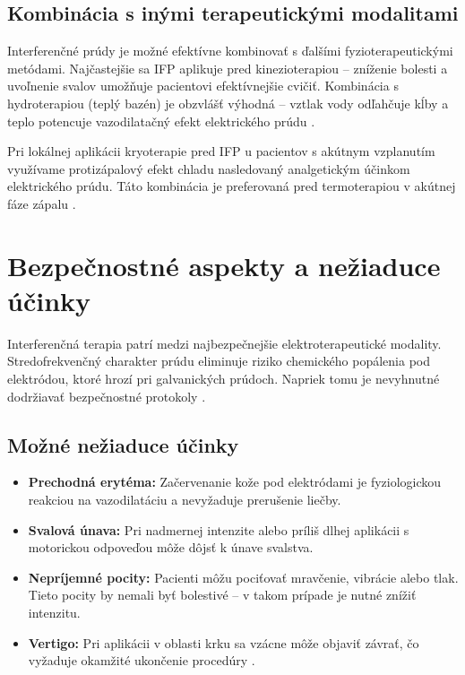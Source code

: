 \subsection{Kombinácia s inými terapeutickými modalitami}
Interferenčné prúdy je možné efektívne kombinovať s ďalšími fyzioterapeutickými metódami. Najčastejšie sa IFP aplikuje pred kinezioterapiou – zníženie bolesti a uvoľnenie svalov umožňuje pacientovi efektívnejšie cvičiť. Kombinácia s hydroterapiou (teplý bazén) je obzvlášť výhodná – vztlak vody odľahčuje kĺby a teplo potencuje vazodilatačný efekt elektrického prúdu \parencite{guth2010rehabilitacia}.

Pri lokálnej aplikácii kryoterapie pred IFP u pacientov s akútnym vzplanutím využívame protizápalový efekt chladu nasledovaný analgetickým účinkom elektrického prúdu. Táto kombinácia je preferovaná pred termoterapiou v akútnej fáze zápalu \parencite{Podebradsky2009}.

\section{Bezpečnostné aspekty a nežiaduce účinky}

Interferenčná terapia patrí medzi najbezpečnejšie elektroterapeutické modality. Stredofrekvenčný charakter prúdu eliminuje riziko chemického popálenia pod elektródou, ktoré hrozí pri galvanických prúdoch. Napriek tomu je nevyhnutné dodržiavať bezpečnostné protokoly \parencite{Watson2020}.

\subsection{Možné nežiaduce účinky}
\begin{itemize}
    \item \textbf{Prechodná erytéma:} Začervenanie kože pod elektródami je fyziologickou reakciou na vazodilatáciu a nevyžaduje prerušenie liečby.
    \item \textbf{Svalová únava:} Pri nadmernej intenzite alebo príliš dlhej aplikácii s motorickou odpoveďou môže dôjsť k únave svalstva.
    \item \textbf{Nepríjemné pocity:} Pacienti môžu pociťovať mravčenie, vibrácie alebo tlak. Tieto pocity by nemali byť bolestivé – v takom prípade je nutné znížiť intenzitu.
    \item \textbf{Vertigo:} Pri aplikácii v oblasti krku sa vzácne môže objaviť závrať, čo vyžaduje okamžité ukončenie procedúry \parencite{Goats1990}.
\end{itemize}

